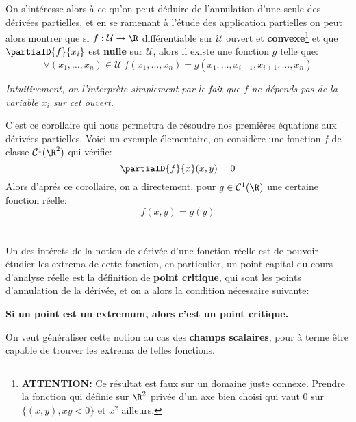 \subsection*{}
On s'intéresse alors à ce qu'on peut déduire de l'annulation d'une seule des dérivées partielles, et en se ramenant à l'étude des application partielles on peut alors montrer que si \(f : \mathcal{U} \rightarrow \R\) différentiable sur \(\mathcal{U}\) ouvert et \textbf{convexe}\footnote[2]{\textbf{ATTENTION:} Ce résultat est faux sur un domaine juste connexe. Prendre la fonction qui définie sur \(\R^2\) privée d'un axe bien choisi qui vaut \(0\) sur \(\{ (x, y), xy < 0\}\) et \(x^2\) ailleurs.} et que \(\partialD{f}{x_i}\) est \textbf{nulle} sur \(\mathcal{U}\), alors il existe une fonction \(g\) telle que:
\[
   \forall (x_1, \ldots, x_n) \in \mathcal{U} \; f(x_1, \ldots, x_n) = g(x_1, \ldots, x_{i-1}, x_{i+1}, \ldots, x_n) 
\]
\begin{center}
   \textit{Intuitivement, on l'interprète simplement par le fait que \(f\) ne dépends pas de la variable \(x_i\) sur cet ouvert.}
\end{center}
C'est ce corollaire qui nous permettra de résoudre nos premières équations aux dérivées partielles. Voici un exemple élementaire, on considère une fonction \(f\) de classe \(\mathcal{C}^1(\R^2)\) qui vérifie:
\[
   \partialD{f}{x}(x, y) = 0   
\]
Alors d'aprés ce corollaire, on a directement, pour \(g \in \mathcal{C}^1(\R)\) une certaine fonction réelle:
\[
   f(x, y) = g(y)   
\]

\chapter*{}
Un des intérets de la notion de dérivée d'une fonction réelle est de pouvoir étudier les extrema de cette fonction, en particulier, un point capital du cours d'analyse réelle est la définition de \textbf{point critique}, qui sont les points d'annulation de la dérivée, et on a alors la condition nécessaire suivante:
\begin{center}
   \textbf{Si un point est un extremum, alors c'est un point critique.}
\end{center}
On veut généraliser cette notion au cas des \textbf{champs scalaires}, pour à terme être capable de trouver les extrema de telles fonctions.

